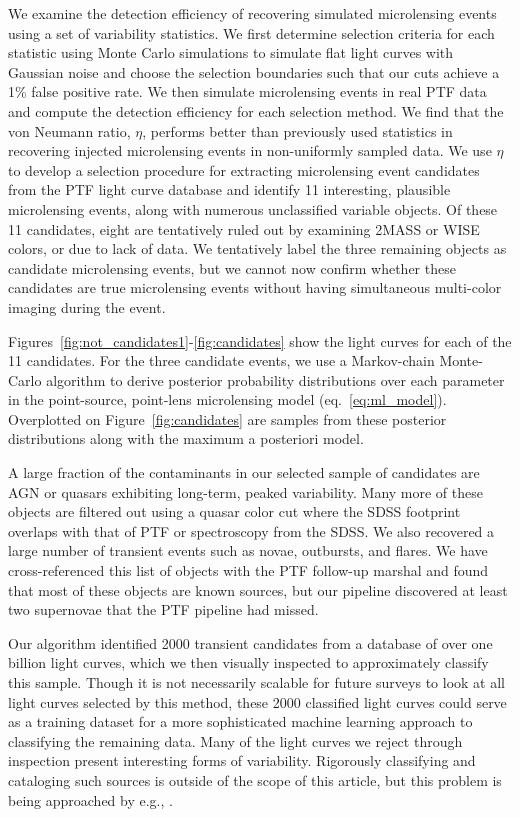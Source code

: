 \documentclass{emulateapj}
\newcommand{\apwsim}{\raisebox{0.2ex}{\scriptsize$\sim$\normalsize}}
\begin{document}
We examine the detection efficiency of recovering simulated microlensing events using a set of variability statistics. We first determine selection criteria for each statistic using Monte Carlo simulations to simulate flat light curves with Gaussian noise and choose the selection boundaries such that our cuts achieve a 1\% false positive rate. We then simulate microlensing events in real PTF data and compute the detection efficiency for each selection method. We find that the von Neumann ratio, $\eta$, performs better than previously used statistics in recovering injected microlensing events in non-uniformly sampled data. We use $\eta$ to develop a selection procedure for extracting microlensing event candidates from the PTF light curve database and identify 11 interesting, plausible microlensing events, along with numerous unclassified variable objects. Of these 11 candidates, eight are tentatively ruled out  by examining 2MASS or WISE colors, or due to lack of data. We tentatively label the three remaining objects as candidate microlensing events, but we cannot now confirm whether these candidates are true microlensing events without having simultaneous multi-color imaging during the event. 

Figures~\ref{fig:not_candidates1}-\ref{fig:candidates} show the light curves for each of the 11 candidates. For the three candidate events, we use a Markov-chain Monte-Carlo algorithm \citep{goodman, dfm} to derive posterior probability distributions over each parameter in the point-source, point-lens microlensing model (eq.~\ref{eq:ml_model}). Overplotted on Figure~\ref{fig:candidates} are samples from these posterior distributions along with the maximum a posteriori model.

A large fraction of the contaminants in our selected sample of candidates are AGN or quasars exhibiting long-term, peaked variability. Many more of these objects are filtered out using a quasar color cut where the SDSS footprint overlaps with that of PTF \citep{richards02} or spectroscopy from the SDSS. We also recovered a large number of transient events such as novae, outbursts, and flares. We have cross-referenced this list of objects with the PTF follow-up marshal and found that most of these objects are known sources, but our pipeline discovered at least two supernovae that the PTF pipeline had missed. 

Our algorithm identified \apwsim 2000 transient candidates from a database of over one billion light curves, which we then visually inspected to approximately classify this sample. Though it is not necessarily scalable for future surveys to look at all light curves selected by this method, these 2000 classified light curves could serve as a training dataset for a more sophisticated machine learning approach to classifying the remaining data. Many of the light curves we reject through inspection present interesting forms of variability. Rigorously classifying and cataloging such sources is outside of the scope of this article, but this problem is being approached by e.g., \cite{bloomPasp}. 
\end{document}
